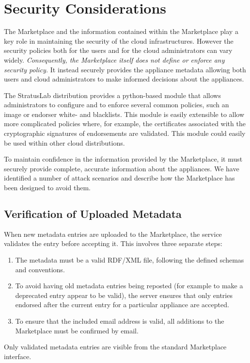 \section{Security Considerations}
\label{sec:security}

The Marketplace and the information contained within the Marketplace
play a key role in maintaining the security of the cloud
infrastructures.  However the security policies both for the users and
for the cloud administrators can vary widely.  {\em Consequently, the
  Marketplace itself does not define or enforce any security policy.}
It instead securely provides the appliance metadata allowing both
users and cloud administrators to make informed decisions about the
appliances.

The StratusLab distribution provides a python-based module that allows
administrators to configure and to enforce several common policies,
such an image or endorser white- and blacklists.  This module is
easily extensible to allow more complicated policies where, for
example, the certificates associated with the cryptographic signatures
of endorsements are validated.  This module could easily be used
within other cloud distributions.

To maintain confidence in the information provided by the Marketplace,
it must securely provide complete, accurate information about the
appliances.  We have identified a number of attack scenarios and
describe how the Marketplace has been designed to avoid them. 

\subsection{Verification of Uploaded Metadata}

When new metadata entries are uploaded to the Marketplace, the service
validates the entry before accepting it.  This involves three
separate steps:
\begin{enumerate}
\item The metadata must be a valid RDF/XML file, following the defined
  schemas and conventions.
\item To avoid having old metadata entries being reposted (for example
  to make a deprecated entry appear to be valid), the server
  ensures that only entries endorsed after the current entry for a particular
  appliance are accepted.
\item To ensure that the included email address is valid, all
  additions to the Marketplace must be confirmed by email.
\end{enumerate}
Only validated metadata entries are visible from the standard
Marketplace interface. 


